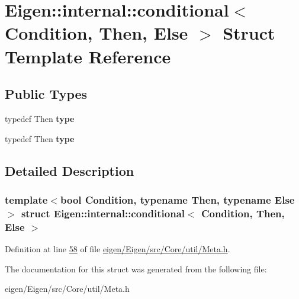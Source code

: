 \hypertarget{struct_eigen_1_1internal_1_1conditional}{}\section{Eigen\+:\+:internal\+:\+:conditional$<$ Condition, Then, Else $>$ Struct Template Reference}
\label{struct_eigen_1_1internal_1_1conditional}
\subsection*{Public Types}
\begin{DoxyCompactItemize}
\item 
\mbox{\label{struct_eigen_1_1internal_1_1conditional_a2433d8a903dfd8c2ea617c77a63b8f8a}} 
typedef Then {\bfseries type}
\item 
\mbox{\label{struct_eigen_1_1internal_1_1conditional_a2433d8a903dfd8c2ea617c77a63b8f8a}} 
typedef Then {\bfseries type}
\end{DoxyCompactItemize}


\subsection{Detailed Description}
\subsubsection*{template$<$bool Condition, typename Then, typename Else$>$\newline
struct Eigen\+::internal\+::conditional$<$ Condition, Then, Else $>$}



Definition at line \hyperlink{eigen_2_eigen_2src_2_core_2util_2_meta_8h_source_l00058}{58} of file \hyperlink{eigen_2_eigen_2src_2_core_2util_2_meta_8h_source}{eigen/\+Eigen/src/\+Core/util/\+Meta.\+h}.



The documentation for this struct was generated from the following file\+:\begin{DoxyCompactItemize}
\item 
eigen/\+Eigen/src/\+Core/util/\+Meta.\+h\end{DoxyCompactItemize}
